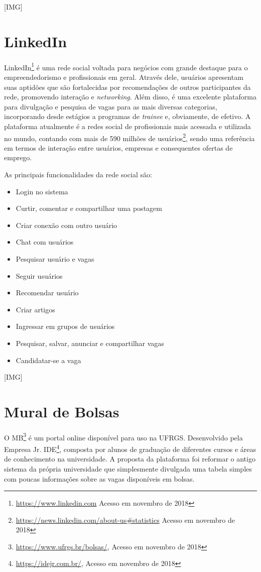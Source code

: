\documentclass[cic,tc]{iiufrgs}
\begin{document}
[IMG]

\section{LinkedIn}
\label{trabRelLinkedin}

LinkedIn\footnote{{\url{https://www.linkedin.com} Acesso em novembro de 2018}} é uma rede social voltada para negócios com grande destaque para o empreendedorismo e profissionais em geral. Através dele, usuários apresentam suas aptidões que são fortalecidas por recomendações de outros participantes da rede, promovendo interação e \textit{networking}. Além disso, é uma excelente plataforma para divulgação e pesquisa de vagas para as mais diversas categorias, incorporando desde estágios a programas de \textit{trainee} e, obviamente, de efetivo. A plataforma atualmente é a redes social de profissionais mais acessada e utilizada no mundo, contando com mais de 590 milhões de usuários\footnote{{\url{https://news.linkedin.com/about-us\#statistics} Acesso em novembro de 2018}}, sendo uma referência em termos de interação entre usuários, empresas e consequentes ofertas de emprego.

As principais funcionalidades da rede social são:
\begin{itemize}
    \item Login no sistema
    \item Curtir, comentar e compartilhar uma postagem
    \item Criar conexão com outro usuário
    \item Chat com usuários
    \item Pesquisar usuário e vagas
    \item Seguir usuários
    \item Recomendar usuário
    \item Criar artigos
    \item Ingressar em grupos de usuários
    \item Pesquisar, salvar, anunciar e compartilhar vagas
    \item Candidatar-se a vaga
\end{itemize}

[IMG]

\section{Mural de Bolsas}
\label{trabRelMDB}

O MB\footnote{{\url{https://www.ufrgs.br/bolsas/}, Acesso em novembro de 2018}} é um portal online disponível para uso na UFRGS. Desenvolvido pela Empresa Jr. IDE\footnote{{\url{https://idejr.com.br/}, Acesso em novembro de 2018}}, composta por alunos de graduação de diferentes cursos e áreas de conhecimento na universidade. A proposta da plataforma foi reformar o antigo sistema da própria universidade que simplesmente divulgada uma tabela simples com poucas informações sobre as vagas disponíveis em bolsas. 
\end{document}

